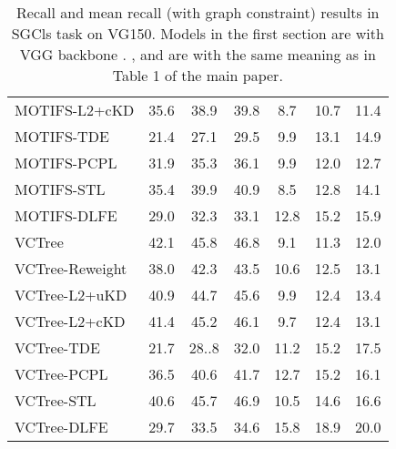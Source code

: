 \documentclass[sigconf]{acmart}
\begin{document}
\begin{table*}[htbp]
{\begin{tabular}{l|c c c c c c}
MOTIFS-L2+cKD\textsuperscript{} \cite{DBLP:conf/bmvc/WangPL20} & 35.6 & 38.9 & 39.8 & 8.7 & 10.7 & 11.4 \\
MOTIFS-TDE\textsuperscript{} \cite{tang2020unbiased} & 21.4 & 27.1 & 29.5 & 9.9 & 13.1 & 14.9 \\
MOTIFS-PCPL\textsuperscript{} \cite{yan2020pcpl} & 31.9 & 35.3 & 36.1 & 9.9 & 12.0 & 12.7 \\
MOTIFS-STL\textsuperscript{} \cite{chen2019soft} & 35.4 & 39.9 & 40.9 & 8.5 & 12.8 & 14.1 \\
MOTIFS-DLFE & 29.0 & 32.3 & 33.1 & 12.8 & 15.2 & 15.9 \\
\hline
VCTree\textsuperscript{} \cite{tang2019learning,tang2020unbiased} & 42.1 & 45.8 & 46.8 & 9.1 & 11.3 & 12.0 \\
VCTree-Reweight\textsuperscript{} & 38.0 & 42.3 & 43.5 & 10.6 & 12.5 & 13.1 \\
VCTree-L2+uKD\textsuperscript{} \cite{DBLP:conf/bmvc/WangPL20} & 40.9 & 44.7 & 45.6 & 9.9 & 12.4 & 13.4 \\ 
VCTree-L2+cKD\textsuperscript{} \cite{DBLP:conf/bmvc/WangPL20} & 41.4 & 45.2 & 46.1 & 9.7 & 12.4 & 13.1 \\ 
VCTree-TDE\textsuperscript{} \cite{tang2020unbiased} & 21.7 & 28..8 & 32.0 & 11.2 & 15.2 & 17.5 \\
VCTree-PCPL\textsuperscript{} \cite{yan2020pcpl} & 36.5 & 40.6 & 41.7 & 12.7 & 15.2 & 16.1 \\
VCTree-STL\textsuperscript{} \cite{chen2019soft} & 40.6 & 45.7 & 46.9 & 10.5 & 14.6 & 16.6 \\
VCTree-DLFE & 29.7 & 33.5 & 34.6 & 15.8 & 18.9 & 20.0 \\
\hline
\end{tabular}
}
\vspace{0.1em}
\caption{Recall and mean recall (with graph constraint) results in SGCls task on VG150. 
Models in the first section are with VGG backbone \cite{simonyan2014very}.
,  and  are with the same meaning as in Table 1 of the main paper.
}
\label{tab:sgg_result_sgcls}
\end{table*}
\end{document}
